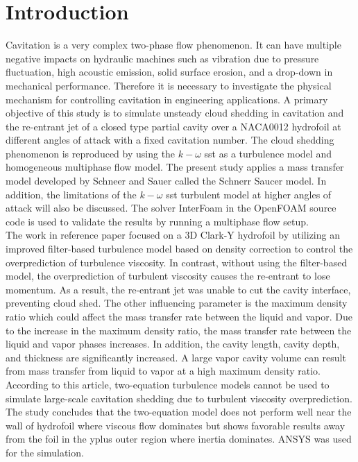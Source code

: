 \chapter*{Introduction}
\label{chap:introduction}
\renewcommand{\thepage}{\arabic{page}}
Cavitation is a very complex two-phase flow phenomenon. 
It can have multiple negative impacts on hydraulic machines 
such as vibration due to pressure fluctuation, high acoustic emission, 
solid surface erosion, and a drop-down in mechanical performance. Therefore 
it is necessary to investigate the physical mechanism for controlling cavitation
 in engineering applications. A primary objective of this study is to simulate 
 unsteady cloud shedding in cavitation and the re-entrant jet of a closed type 
 partial cavity over a NACA0012 hydrofoil at different angles of attack with a 
 fixed cavitation number. The cloud shedding phenomenon is reproduced by using 
 the $k- {\omega}$ sst as a turbulence model and homogeneous multiphase flow model. 
 The present study applies a mass transfer model developed by Schneer and Sauer called 
 the Schnerr Saucer model. In addition, the limitations of the $k-\omega$ sst turbulent 
 model at higher angles of attack will also be discussed.
 The solver InterFoam in the OpenFOAM\cite{OpenFOAM-9,Peric} source code is used to validate the 
 results by running a multiphase flow setup.\\ 
 
 The work in reference paper \cite{ZHANG2017} focused on a 3D Clark-Y hydrofoil by 
 utilizing an improved filter-based turbulence model based on density correction 
 to control the overprediction of turbulence viscosity. In contrast, without using the filter-based model, 
 the overprediction of turbulent viscosity causes the re-entrant to lose momentum. 
 As a result, the re-entrant jet was unable to cut the cavity interface, preventing cloud shed. The other influencing parameter is 
 the maximum density ratio which could affect the mass transfer 
 rate between the liquid and vapor. Due to the increase in the maximum density ratio, 
 the mass transfer rate between the liquid and vapor phases increases. In addition, 
 the cavity length, cavity depth, and thickness are significantly increased. 
 A large vapor cavity volume can result from mass transfer from liquid to vapor 
 at a high maximum density ratio. According to this article, two-equation turbulence 
 models cannot be used to simulate large-scale cavitation shedding due to turbulent 
 viscosity overprediction. The study concludes that the two-equation model does not 
 perform well near the wall of hydrofoil where viscous flow dominates but shows favorable results 
 away from the foil in the yplus outer region where inertia dominates. 
 ANSYS was used for the simulation.\\

